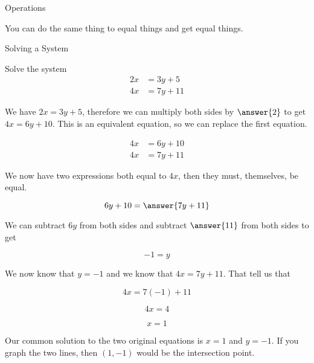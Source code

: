 \documentclass{ximera}
\begin{document}
\begin{fact} Operations

You can do the same thing to equal things and get equal things.

\end{fact}






\begin{example} Solving a System


Solve the system
\begin{align*}
2x & = 3y + 5 \\
4x & = 7y + 11
\end{align*}



\begin{explanation}

We have $2x = 3y + 5$, therefore we can multiply both sides by $\answer{2}$ to get $4x = 6y + 10$.  This is an equivalent equation, so we can replace the first equation.

\begin{align*}
4x & = 6y + 10 \\
4x & = 7y + 11
\end{align*}


We now have two expressions both equal to $4x$, then they must, themselves, be equal.


\[   6y + 10 =  \answer{7y + 11}   \]

We can subtract $6y$ from both sides and subtract $\answer{11}$ from both sides to get


\[   -1 =  y   \]



We now know that $y=-1$ and we know that $4x = 7y + 11$.  That tell us that 


\[   4x = 7(-1) + 11   \]

\[   4x = 4   \]


\[ x = 1 \]


Our common solution to the two original equations is $x = 1$ and $y = -1$.  If you graph the two lines, then $(1, -1)$ would be the intersection point.

\end{explanation}
\end{example}
\end{document}
